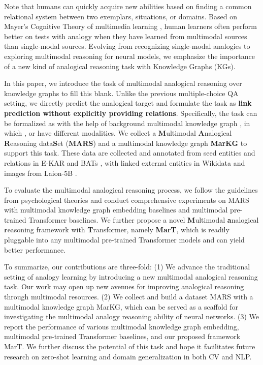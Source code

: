 \documentclass{article} \usepackage{iclr2023_conference,times}
\newcommand{\ours}{MarT}
\newcommand{\data}{MARS}
\newcommand{\kg}{MarKG}
\begin{document}
Note that humans can quickly acquire new abilities based on finding a common relational system between two exemplars, situations, or domains.
Based on Mayer's Cognitive Theory of multimedia learning \citep{hegarty1993constructing,mayer2002multimedia}, human learners often perform better on tests with analogy when they have learned from multimodal sources than single-modal sources. 
Evolving from recognizing single-modal analogies to exploring multimodal reasoning for neural models, we emphasize the importance of a new kind of analogical reasoning task with Knowledge Graphs (KGs).


In this paper, we introduce the task of multimodal analogical reasoning over knowledge graphs to fill this blank.
Unlike the previous multiple-choice QA setting, we directly predict the analogical target and formulate the task as \textbf{link prediction without explicitly providing relations}.
Specifically, the task can be formalized as  with the help of background multimodal knowledge graph , in which ,  or  have different modalities.
We collect a \textbf{M}ultimodal \textbf{A}nalogical \textbf{R}easoning data\textbf{S}et (\textbf{{\data}}) and a multimodal knowledge graph \textbf{{\kg}} to support this task. 
These data are collected and annotated from seed entities and relations in E-KAR \citep{E-KAR} and BATs \citep{BATs}, with linked external entities in Wikidata and images from  Laion-5B \citep{Laion400M}.

To evaluate the multimodal analogical reasoning process, we follow the guidelines from psychological theories and conduct comprehensive experiments on {\data} with multimodal knowledge graph embedding baselines and multimodal pre-trained Transformer baselines.
We further propose a novel \textbf{M}ultimodal \textbf{a}nalogical \textbf{r}easoning framework with \textbf{T}ransformer, namely {\textbf{\ours}}, which is readily pluggable into any multimodal pre-trained Transformer models and can yield better performance.


To summarize, our contributions are three-fold:
(1) We advance the traditional setting of analogy learning by introducing a new multimodal analogical reasoning task.
Our work may open up new avenues for improving analogical reasoning through multimodal resources.
(2) We collect and build a dataset {\data} with a multimodal knowledge graph \kg, which can be served as a scaffold for investigating the multimodal analogy reasoning ability of neural networks.
(3) We report the performance of various multimodal knowledge graph embedding, multimodal pre-trained Transformer baselines, and our proposed framework {\ours}.
We further discuss the potential of this task and hope it facilitates future research on zero-shot learning and domain generalization in both CV and NLP.
\end{document}
